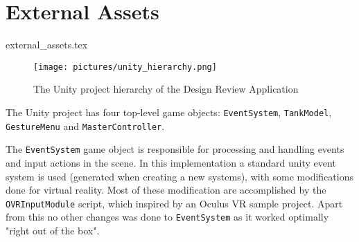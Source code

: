 % 
% 
% 

\section{External Assets}
\label{sec:external_assets}
{external_assets.tex}

\begin{figure}%
	\texttt{[image: pictures/unity\_hierarchy.png]} %
	\caption[The Unity project hierarchy of the Design Review Application]{The Unity project hierarchy of the Design Review Application}
	\label{fig:unity_hierarchy}
\end{figure} 

The Unity project has four top-level game objects: \texttt{EventSystem}, \texttt{TankModel}, \texttt{GestureMenu} and \texttt{MasterController}. 

The \texttt{EventSystem} game object is responsible for processing and handling events and input actions in the scene. 
In this implementation a standard unity event system is used (generated when creating a new systems), with some modifications done for virtual reality.
Most of these modification are accomplished by the \texttt{OVRInputModule} script, which inspired by an Oculus VR sample project. 
Apart from this no other changes was done to \texttt{EventSystem} as it worked optimally "right out of the box".

